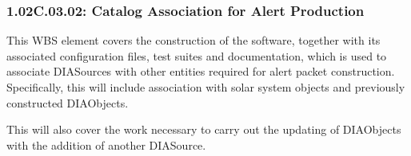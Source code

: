 \subsubsection{1.02C.03.02: Catalog Association for Alert Production}

This WBS element covers the construction of the software,
together with its associated configuration files, test suites and
documentation, which is used to associate
DIASources with other entities required for alert packet construction.
Specifically, this will include association with solar system objects
and previously constructed DIAObjects.

This will also cover the work necessary to carry out the updating
of DIAObjects with the addition of another DIASource.
